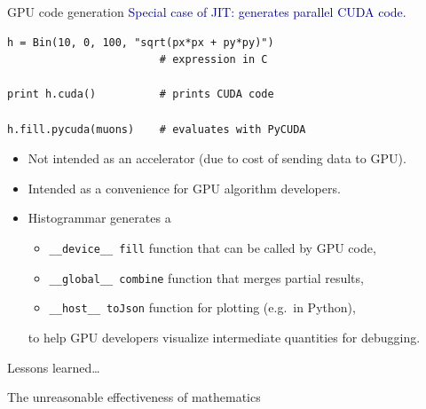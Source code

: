 \documentclass[aspectratio=169]{beamer}
\begin{document}
\begin{frame}[fragile]{GPU code generation}
\vspace{0.5 cm}
\textcolor{darkblue}{\large Special case of JIT: generates parallel CUDA code.}

\begin{center}
\begin{minipage}{0.7\linewidth}
\small
\begin{verbatim}
h = Bin(10, 0, 100, "sqrt(px*px + py*py)")
                        # expression in C

print h.cuda()          # prints CUDA code

h.fill.pycuda(muons)    # evaluates with PyCUDA
\end{verbatim}
\end{minipage}
\end{center}

\large
\begin{itemize}
\item<2-> Not intended as an accelerator (due to cost of sending data to GPU).
\item<3-> Intended as a convenience for GPU algorithm developers.
\item<4-> Histogrammar generates a
\begin{itemize}
\item {\tt \_\_device\_\_ fill} function that can be called by GPU code,
\item {\tt \_\_global\_\_ combine} function that merges partial results,
\item {\tt \_\_host\_\_ toJson} function for plotting (e.g.\ in Python),
\end{itemize}
to help GPU developers visualize intermediate quantities for debugging.
\end{itemize}
\end{frame}

\begin{frame}{Lessons learned\ldots}
\begin{center}
\LARGE The unreasonable effectiveness of mathematics
\end{center}
\end{frame}
\end{document}

